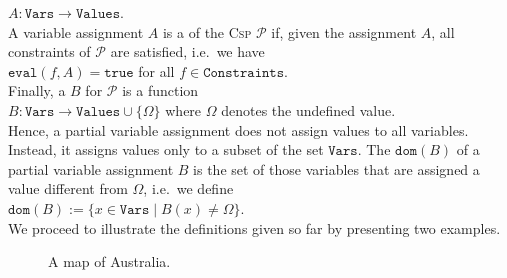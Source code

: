 $A: \mathtt{Vars} \rightarrow \mathtt{Values}$.
\\[0.2cm]
A variable assignment $A$ is a  of the \textsc{Csp} $\mathcal{P}$ 
if, given the assignment $A$, all constraints of $\mathcal{P}$ are satisfied, i.e.~we have
\\[0.2cm]
\hspace*{1.3cm}
$\mathtt{eval}(f, A) = \mathtt{true}$ \quad for all $f \in \mathtt{Constraints}$.
\\[0.2cm]
Finally, a  $B$ for $\mathcal{P}$ is a function
\\[0.2cm]
\hspace*{1.3cm}
$B: \mathtt{Vars} \rightarrow \mathtt{Values} \cup \{ \Omega \}$ \quad where $\Omega$ denotes the undefined value.
\\[0.2cm]
Hence, a partial variable assignment does not assign values to all variables.  Instead, it assigns values only
to a subset of the set $\mathtt{Vars}$.  The  $\mathtt{dom}(B)$ of a partial variable assignment $B$ is the
set of those variables that are assigned a value different from $\Omega$, i.e.~we define
\\[0.2cm]
\hspace*{1.3cm}
$\mathtt{dom}(B) := \bigl\{ x \in \mathtt{Vars} \mid B(x) \not= \Omega \bigr\}$.
\\[0.2cm]
We proceed to illustrate the definitions given so far by presenting two examples.


\begin{figure}[!ht]
  \centering
  \caption{A map of Australia.}
  \label{fig:australia.pdf}
\end{figure}

